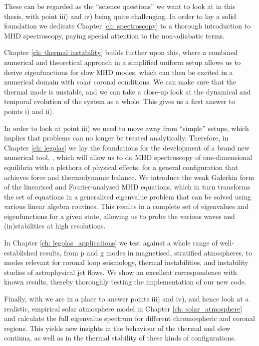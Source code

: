 These can be regarded as the ``science questions'' we want to look at in this thesis, with point iii) and iv)  being quite challenging. In order to lay a solid foundation we dedicate Chapter \ref{ch: spectroscopy} to a thorough introduction to MHD spectroscopy, paying special attention to the non-adiabatic terms.

Chapter \ref{ch: thermal instability} builds further upon this, where a combined numerical and theoretical approach in a simplified uniform setup allows us to derive eigenfunctions for slow MHD modes, which can then be excited in a numerical domain with solar coronal conditions. We can make sure that the thermal mode is unstable, and we can take a close-up look at the dynamical and temporal evolution of the system as a whole. This gives us a first answer to points i) and ii).

In order to look at point iii) we need to move away from ``simple'' setups, which implies that problems can no longer be treated analytically. Therefore, in Chapter \ref{ch: legolas} we lay the foundations for the development of a brand new numerical tool, {\legolas}, which will allow us to do MHD spectroscopy of one-dimensional equilibria with a plethora of physical effects, for a general configuration that achieves force and thermodynamic balance. We introduce the weak Galerkin form of the linearised and Fourier-analysed MHD equations, which in turn transforms the set of equations in a generalised eigenvalue problem that can be solved using various linear algebra routines. This results in a complete set of eigenvalues and eigenfunctions for a given state, allowing us to probe the various waves and (in)stabilities at high resolutions.

In Chapter \ref{ch: legolas_applications} we test {\legolas} against a whole range of well-established results, from p and g modes in magnetised, stratified atmospheres, to modes relevant for coronal loop seismology, thermal instabilities, and instability studies of astrophysical jet flows. We show an excellent correspondence with known results, thereby thoroughly testing the implementation of our new code.

Finally, with {\legolas} we are in a place to answer points iii) and iv), and hence look at a realistic, empirical solar atmosphere model in Chapter \ref{ch: solar_atmosphere} and calculate the full eigenvalue spectrum for different chromospheric and coronal regions. This yields new insights in the behaviour of the thermal and slow continua, as well as in the thermal stability of these kinds of configurations.




\cleardoublepage
